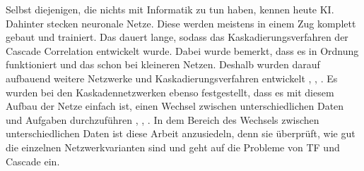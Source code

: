 
Selbst diejenigen, die nichts mit Informatik zu tun haben, kennen heute KI. 
Dahinter stecken neuronale Netze. Diese werden meistens in einem Zug komplett gebaut und trainiert. 
Das dauert lange, sodass das Kaskadierungsverfahren der Cascade Correlation \cite{cascor} entwickelt wurde. 
Dabei wurde bemerkt, dass es in Ordnung funktioniert und das schon bei kleineren Netzen. Deshalb wurden darauf aufbauend 
weitere Netzwerke und Kaskadierungsverfahren entwickelt \cite{cascade_network_architectures}, \cite{Constructive_Cascade}, 
\cite{deep_cascade_learning}. Es wurden bei den Kaskadennetzwerken ebenso festgestellt, dass es mit diesem Aufbau der Netze 
einfach ist, einen Wechsel zwischen unterschiedlichen Daten und Aufgaben durchzuführen \cite{phd_deep_cascade}, \cite{transfer_learning}, 
\cite{survey_transfer}. In dem Bereich des Wechsels zwischen unterschiedlichen Daten ist diese Arbeit anzusiedeln, denn sie überprüft, wie 
gut die einzelnen Netzwerkvarianten sind und geht auf die Probleme von TF und Cascade ein. 





